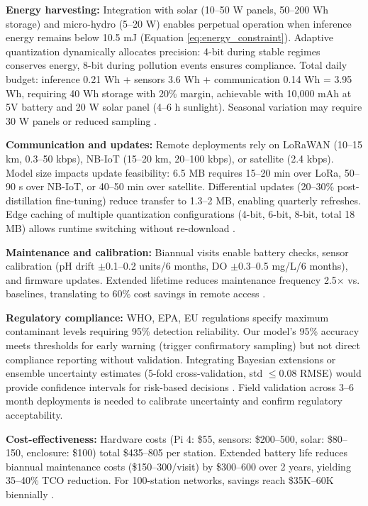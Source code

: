 \documentclass[12pt,a4paper]{article}
\begin{document}
\textbf{Energy harvesting:} Integration with solar (10--50 W panels, 50--200 Wh storage) and micro-hydro (5--20 W) enables perpetual operation when inference energy remains below 10.5 mJ (Equation \ref{eq:energy_constraint}). Adaptive quantization dynamically allocates precision: 4-bit during stable regimes conserves energy, 8-bit during pollution events ensures compliance. Total daily budget: inference 0.21 Wh + sensors 3.6 Wh + communication 0.14 Wh = 3.95 Wh, requiring 40 Wh storage with 20\% margin, achievable with 10,000 mAh at 5V battery and 20 W solar panel (4--6 h sunlight). Seasonal variation may require 30 W panels or reduced sampling \citep{qin2025mixed, singh2024smart}.

\textbf{Communication and updates:} Remote deployments rely on LoRaWAN (10--15 km, 0.3--50 kbps), NB-IoT (15--20 km, 20--100 kbps), or satellite (2.4 kbps). Model size impacts update feasibility: 6.5 MB requires 15--20 min over LoRa, 50--90 s over NB-IoT, or 40--50 min over satellite. Differential updates (20--30\% post-distillation fine-tuning) reduce transfer to 1.3--2 MB, enabling quarterly refreshes. Edge caching of multiple quantization configurations (4-bit, 6-bit, 8-bit, total 18 MB) allows runtime switching without re-download \citep{sinha2024hwevnas, wandb2025qat}.

\textbf{Maintenance and calibration:} Biannual visits enable battery checks, sensor calibration (pH drift $\pm$0.1--0.2 units/6 months, DO $\pm$0.3--0.5 mg/L/6 months), and firmware updates. Extended lifetime reduces maintenance frequency 2.5$\times$ vs. baselines, translating to 60\% cost savings in remote access \citep{singh2024smart, chapman2021waterapproxapprox}.

\textbf{Regulatory compliance:} WHO, EPA, EU regulations specify maximum contaminant levels requiring 95\% detection reliability. Our model's 95\% accuracy meets thresholds for early warning (trigger confirmatory sampling) but not direct compliance reporting without validation. Integrating Bayesian extensions or ensemble uncertainty estimates (5-fold cross-validation, std $\leq$0.08 RMSE) would provide confidence intervals for risk-based decisions \citep{chapman2021waterapproxapprox, campos2026automl}. Field validation across 3--6 month deployments is needed to calibrate uncertainty and confirm regulatory acceptability.

\textbf{Cost-effectiveness:} Hardware costs (Pi 4: \$55, sensors: \$200--500, solar: \$80--150, enclosure: \$100) total \$435--805 per station. Extended battery life reduces biannual maintenance costs (\$150--300/visit) by \$300--600 over 2 years, yielding 35--40\% TCO reduction. For 100-station networks, savings reach \$35K--60K biennially \citep{qin2025mixed, forhad2024iot}.
\end{document}
